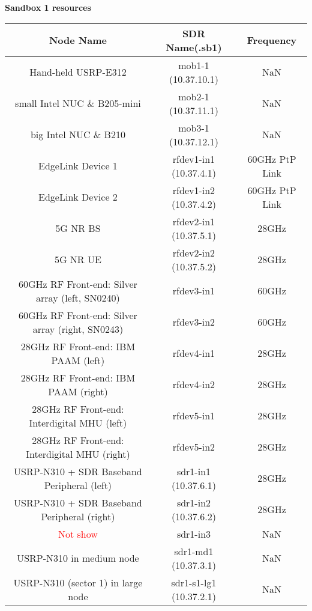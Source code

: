 \documentclass{article}
\begin{document}
    \textbf{Sandbox 1 resources}
    \begin{center}
        \begin{tabular}{||c c c||} 
            \hline
            \textbf{Node Name} & \textbf{SDR Name(.sb1)} & Frequency \\ [0.5ex] 
            \hline\hline
            Hand-held USRP-E312 & mob1-1 (10.37.10.1) & NaN \\ 
            \hline
            small Intel NUC \& B205-mini & mob2-1 (10.37.11.1) & NaN \\ 
            \hline
            big Intel NUC \& B210 & mob3-1 (10.37.12.1) & NaN \\ 
            \hline
            EdgeLink Device 1 & rfdev1-in1 (10.37.4.1) & 60GHz PtP Link \\
            \hline
            EdgeLink Device 2 & rfdev1-in2 (10.37.4.2) & 60GHz PtP Link \\
            \hline
            5G NR BS & rfdev2-in1 (10.37.5.1) & 28GHz \\
            \hline
            5G NR UE & rfdev2-in2 (10.37.5.2) & 28GHz \\
            \hline
            60GHz RF Front-end: Silver array (left, SN0240) & rfdev3-in1 & 60GHz \\
            \hline
            60GHz RF Front-end: Silver array (right, SN0243) & rfdev3-in2 & 60GHz \\
            \hline
            28GHz RF Front-end: IBM PAAM (left) & rfdev4-in1 & 28GHz \\
            \hline
            28GHz RF Front-end: IBM PAAM (right) & rfdev4-in2 & 28GHz \\
            \hline
            28GHz RF Front-end: Interdigital MHU (left) & rfdev5-in1 & 28GHz \\
            \hline
            28GHz RF Front-end: Interdigital MHU (right) & rfdev5-in2 & 28GHz \\
            \hline
            USRP-N310 + SDR Baseband Peripheral (left) & sdr1-in1 (10.37.6.1) & 28GHz \\
            \hline
            USRP-N310 + SDR Baseband Peripheral (right) & sdr1-in2 (10.37.6.2) & 28GHz \\
            \hline
            \textcolor{red}{Not show} & sdr1-in3 & NaN \\
            \hline
            USRP-N310 in medium node & sdr1-md1 (10.37.3.1) & NaN \\
            \hline
            USRP-N310 (sector 1) in large node & sdr1-s1-lg1 (10.37.2.1) & NaN \\

\end{tabular}
\end{center}
\end{document}
